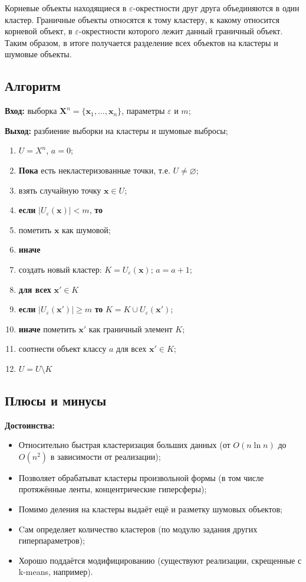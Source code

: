 \documentclass[10pt]{article}
\renewcommand{\geq}{\geqslant}
\newcommand{\eps}{\varepsilon}
\begin{document}
Корневые объекты находящиеся в $\eps$-окрестности друг друга объединяются в один кластер. Граничные объекты относятся к тому кластеру, к какому относится корневой
объект, в $\eps$-окрестности которого лежит данный граничный объект. Таким образом, в итоге получается разделение всех объектов на кластеры и шумовые объекты.

\subsection{Алгоритм}
	
\textbf{Вход:} выборка $\pmb X^{n} = \{\pmb x_1, \dots, \pmb x_{n}\}$, параметры $\varepsilon$ и $m$;
	
\textbf{Выход:} разбиение выборки на кластеры и шумовые выбросы;
\begin{enumerate}
		\item $U=X^n$, $a=0$; 
		\item \textbf{Пока} есть некластеризованные точки, т.е. $U \neq \varnothing$; 
		\item \quad взять случайную точку $\pmb x \in U$; 
		\item \quad \textbf{если} $|U_\varepsilon (\pmb x)| < m$, \textbf{то} 
		\item \quad \quad пометить $\pmb x$ как шумовой; 
		\item \quad \textbf{иначе} 
		\item \quad \quad создать новый кластер: $K=U_\varepsilon (\pmb x)$; $a = a + 1$; 
		\item \quad \quad \textbf{для всех} $\pmb x' \in K$ 
		\item \quad \quad \quad \textbf{если} $|U_\varepsilon (\pmb x')| \geq m$ \textbf{то} $K=K \cup U_\varepsilon(\pmb x')$; 
		\item \quad \quad \quad \textbf{иначе} пометить $\pmb x'$ как граничный элемент $K$; 
		\item \quad \quad соотнести объект классу $a$ для всех $\pmb x' \in K$; 
		\item \quad \quad $U=U \setminus K$ 
\end{enumerate}

\subsection{Плюсы и минусы}
\textbf{Достоинства:} 
\begin{itemize}
	\item Относительно быстрая кластеризация больших данных (от $O(n \ln n)$ до $O(n^2)$ в зависимости от реализации); 
	\item Позволяет обрабатыват кластеры произвольной формы (в том числе протяжённые ленты, концентрические гиперсферы); 
	\item Помимо деления на кластеры выдаёт ещё и разметку шумовых объектов; 
	\item Cам определяет количество кластеров (по модулю задания других гиперпараметров);
	\item Хорошо поддаётся модифицированию (существуют реализации, скрещенные с k-means, например). 
\end{itemize}
\end{document}
